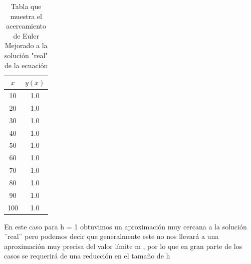 \documentclass[12pt,a4paper]{article}
\begin{document}
   \begin{table}[H]
    \centering
    \begin{tabular}{cc}
    \toprule
    \(x\) & \(y(x)\) \\
    \midrule
    10   & 1.0 \\
    20   & 1.0 \\
    30   & 1.0 \\
    40   & 1.0 \\
    50   & 1.0 \\
    60   & 1.0 \\
    70   & 1.0 \\
    80   & 1.0 \\
    90   & 1.0 \\
    100  & 1.0 \\
    \bottomrule
    \end{tabular}
    \caption{Tabla que muestra el acercamiento de Euler Mejorado a la solución "real" de la ecuación}
    \label{tab:euler_mejorado}
    \end{table}
    En este caso para h = 1 obtuvimos un aproximación muy cercana
    a la solución ¨real¨ pero podemos decir que generalmente este no nos
    llevará a una aproximación muy precisa del valor límite m , por lo que
    en gran parte de los casos se requerirá de una reducción en el tamaño de h
\end{document}
